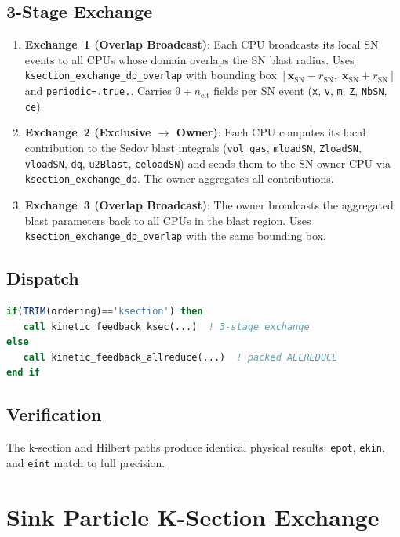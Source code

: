 \documentclass[11pt,fleqn]{book}
\begin{document}
\section{3-Stage Exchange}

\begin{enumerate}[leftmargin=2em]
  \item \textbf{Exchange~1 (Overlap Broadcast)}: Each CPU broadcasts its local SN events to all CPUs whose domain overlaps the SN blast radius. Uses \texttt{ksection\_exchange\_dp\_overlap} with bounding box $[\mathbf{x}_\mathrm{SN} - r_\mathrm{SN},\; \mathbf{x}_\mathrm{SN} + r_\mathrm{SN}]$ and \texttt{periodic=.true.}. Carries $9 + n_\mathrm{elt}$ fields per SN event (\texttt{x}, \texttt{v}, \texttt{m}, \texttt{Z}, \texttt{NbSN}, \texttt{ce}).
  \item \textbf{Exchange~2 (Exclusive $\to$ Owner)}: Each CPU computes its local contribution to the Sedov blast integrals (\texttt{vol\_gas}, \texttt{mloadSN}, \texttt{ZloadSN}, \texttt{vloadSN}, \texttt{dq}, \texttt{u2Blast}, \texttt{celoadSN}) and sends them to the SN owner CPU via \texttt{ksection\_exchange\_dp}. The owner aggregates all contributions.
  \item \textbf{Exchange~3 (Overlap Broadcast)}: The owner broadcasts the aggregated blast parameters back to all CPUs in the blast region. Uses \texttt{ksection\_exchange\_dp\_overlap} with the same bounding box.
\end{enumerate}

\section{Dispatch}

\begin{lstlisting}[language=Fortran,basicstyle=\ttfamily\small]
if(TRIM(ordering)=='ksection') then
   call kinetic_feedback_ksec(...)  ! 3-stage exchange
else
   call kinetic_feedback_allreduce(...)  ! packed ALLREDUCE
end if
\end{lstlisting}

\section{Verification}

The k-section and Hilbert paths produce identical physical results: \texttt{epot}, \texttt{ekin}, and \texttt{eint} match to full precision.


\chapter{Sink Particle K-Section Exchange}
\label{ch:sink-ksection}
\end{document}
